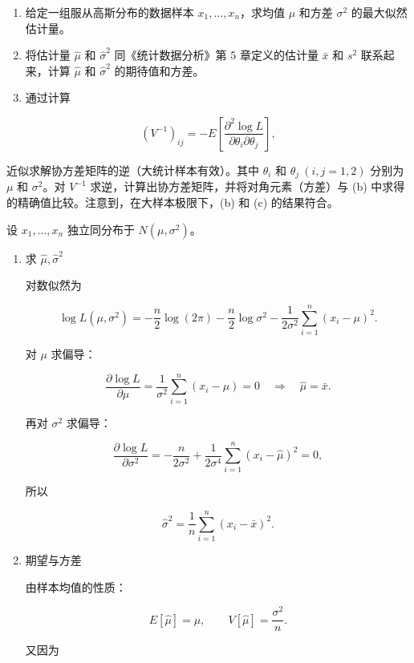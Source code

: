 ﻿





\begin{question}
\begin{enumerate}
\item
  给定一组服从高斯分布的数据样本 \(x_1,\ldots,x_n\)，求均值 \(\mu\)
  和方差 \(\sigma^2\) 的最大似然估计量。
\item
  将估计量 \(\hat\mu\) 和 \(\hat\sigma^2\) 同《统计数据分析》第 5
  章定义的估计量 \(\bar x\) 和 \(s^2\) 联系起来，计算 \(\hat\mu\) 和
  \(\hat\sigma^2\) 的期待值和方差。
\item
  通过计算
\end{enumerate}

\[
(V^{-1})_{ij}=-E\left[\frac{\partial^2\log L}{\partial\theta_i\partial\theta_j}\right],
\]

近似求解协方差矩阵的逆（大统计样本有效）。其中 \(\theta_i\) 和
\(\theta_j\ (i,j=1,2)\) 分别为 \(\mu\) 和 \(\sigma^2\)。对 \(V^{-1}\)
求逆，计算出协方差矩阵，并将对角元素（方差）与 (b)
中求得的精确值比较。注意到，在大样本极限下，(b) 和 (c) 的结果符合。
\begin{solution}
设 \(x_1,\dots,x_n\) 独立同分布于 \(N(\mu,\sigma^2)\)。

\begin{enumerate}
\item 求 \(\hat\mu,\hat\sigma^2\)

对数似然为

\[
\log L(\mu,\sigma^2)
=-\frac n2\log(2\pi)-\frac n2\log\sigma^2-
\frac1{2\sigma^2}\sum_{i=1}^n (x_i-\mu)^2.
\]

对 \(\mu\) 求偏导：

\[
\frac{\partial\log L}{\partial\mu}
=\frac1{\sigma^2}\sum_{i=1}^n(x_i-\mu)=0
\quad\Rightarrow\quad
\hat\mu=\bar x.
\]

再对 \(\sigma^2\) 求偏导：

\[
\frac{\partial\log L}{\partial\sigma^2}
=-\frac{n}{2\sigma^2}+\frac1{2\sigma^4}\sum_{i=1}^n(x_i-\hat\mu)^2=0,
\]

所以

\[
\hat\sigma^2=\frac1n\sum_{i=1}^n(x_i-\bar x)^2.
\]

\item 期望与方差

由样本均值的性质：

\[
E[\hat\mu]=\mu,\qquad V[\hat\mu]=\frac{\sigma^2}{n}.
\]

又因为


\end{enumerate}
\end{solution}
\end{question}
